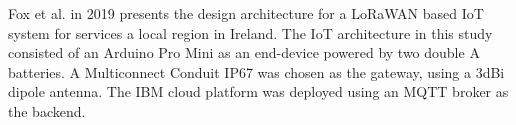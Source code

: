Fox et al. in 2019 \cite{IoT-Regional-Service} presents the design architecture for a LoRaWAN based IoT system for services a local region in Ireland. The IoT architecture in this study consisted of an Arduino Pro Mini as an end-device powered by two double A batteries. A Multiconnect Conduit IP67 was chosen as the gateway, using a 3dBi dipole antenna. The IBM cloud platform was deployed using an MQTT broker as the backend. 
